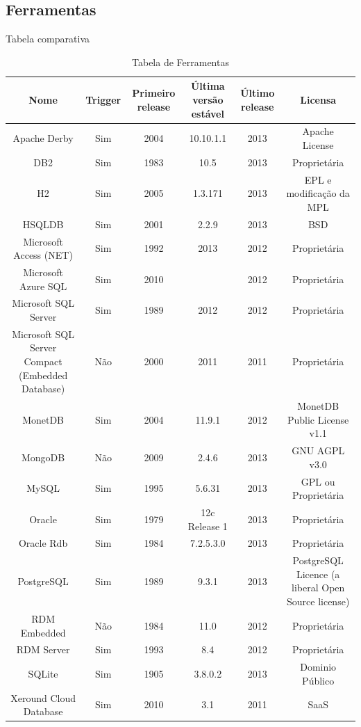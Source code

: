 \documentclass[conference]{IEEEtran}
\begin{document}
  \subsection{Ferramentas}
  Tabela comparativa
  \begin{table}[!t]
    \renewcommand{\arraystretch}{1}
    \caption{Tabela de Ferramentas}
    \label{table_example}
    \centering
    \begin{tabular}{ c  c  c  c  c  c }
      \hline
      \bfseries Nome & \bfseries Trigger & \bfseries Primeiro release & \bfseries Última versão estável & \bfseries Último release & \bfseries Licensa \\
      \hline
      Apache Derby & Sim & 2004 & 10.10.1.1 & 2013 & Apache License \\
      \hline
      DB2 & Sim & 1983 & 10.5 & 2013 & Proprietária \\
      \hline
      H2 & Sim & 2005 & 1.3.171 & 2013 & EPL e modificação da MPL \\
      \hline
      HSQLDB & Sim & 2001 & 2.2.9 & 2013 & BSD \\
      \hline
      Microsoft Access (NET) & Sim & 1992 & 2013 & 2012 & Proprietária \\
      \hline
      Microsoft Azure SQL & Sim & 2010 & & 2012 & Proprietária \\
      \hline
      Microsoft SQL Server & Sim & 1989 & 2012 &  2012 &  Proprietária \\
      \hline
      Microsoft SQL Server Compact (Embedded Database) & Não & 2000 & 2011 & 2011 & Proprietária \\
      \hline
      MonetDB & Sim & 2004 & 11.9.1 & 2012 & MonetDB Public License v1.1 \\
      \hline
      MongoDB & Não & 2009 & 2.4.6 & 2013 & GNU AGPL v3.0 \\
      \hline
      MySQL & Sim & 1995 & 5.6.31 & 2013 & GPL ou Proprietária\\
      \hline
      Oracle & Sim & 1979 & 12c Release 1 & 2013 & Proprietária\\
      \hline
      Oracle Rdb  & Sim & 1984 & 7.2.5.3.0 & 2013 & Proprietária\\
      \hline
      PostgreSQL & Sim & 1989 & 9.3.1 & 2013 & PostgreSQL Licence (a liberal Open Source license) \\
      \hline
      RDM Embedded & Não & 1984 & 11.0 & 2012 & Proprietária \\
      \hline
      RDM Server & Sim & 1993 & 8.4 & 2012 & Proprietária \\
      \hline
      SQLite & Sim & 1905 & 3.8.0.2 & 2013 & Dominio Público \\
      \hline
      Xeround Cloud Database & Sim & 2010 & 3.1 & 2011 & SaaS \\
      \hline
    \end{tabular}
  \end{table}
\end{document}
